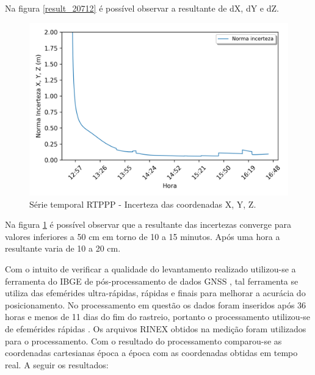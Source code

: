 Na figura \ref{result_20712} é possível observar a resultante de dX, dY e dZ.

\begin{figure}[H]
\centering
\includegraphics[scale=0.9]{data/Graphics/RJ_T20712/RJ_T20712_graphic_uncertainty.png}
\caption{Série temporal RTPPP - Incerteza das coordenadas X, Y, Z.}
\label{incerteza_20712}
\end{figure}

Na figura \ref{incerteza_20712} é possível observar que a resultante das incertezas converge para valores inferiores a 50 cm em torno de 10 a 15 minutos. Após uma hora a resultante varia de 10 a 20 cm.

Com o intuito de verificar a qualidade do levantamento realizado utilizou-se a ferramenta do IBGE de pós-processamento de dados GNSS \citep{ibge-ppp}, tal ferramenta se utiliza das efemérides ultra-rápidas, rápidas e finais para melhorar a acurácia do posicionamento. No processamento em questão os dados foram inseridos após 36 horas e menos de 11 dias do fim do rastreio, portanto o processamento utilizou-se de efemérides rápidas \citep{ibge_manual_ppp}. Os arquivos RINEX obtidos na medição foram utilizados para o processamento. Com o resultado do processamento comparou-se as coordenadas cartesianas época a época com as coordenadas obtidas em tempo real. A seguir os resultados:



